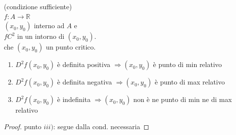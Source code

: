 \documentclass[a4paper, oneside]{article}
\begin{document}
        \begin{theorem}
            (condizione sufficiente)\\
             $f : A \to \mathbb{R}$\\
             $(x_0,y_0)$ interno ad $A$ e \\
             $f C^2$ in un intorno di $(x_0,y_0)$.\\
             che $(x_0,y_0)$ un punto critico.\\
            \begin{enumerate}[$i)$]
                \item {} $D^2f(x_0,y_0)$ è definita positiva $\Rightarrow (x_0,y_0)$ è punto di min relativo
                \item {} $D^2f(x_0,y_0)$ è definita negativa $\Rightarrow (x_0,y_0)$ è punto di max relativo
                \item {} $D^2f(x_0,y_0)$ è indefinita $\Rightarrow (x_0,y_0)$ non è ne punto di min ne di max relativo
            \end{enumerate}
        \end{theorem}
        \begin{proof}
            punto $iii)$: segue dalla cond. necessaria
        \end{proof}

        \newpage
\end{document}
